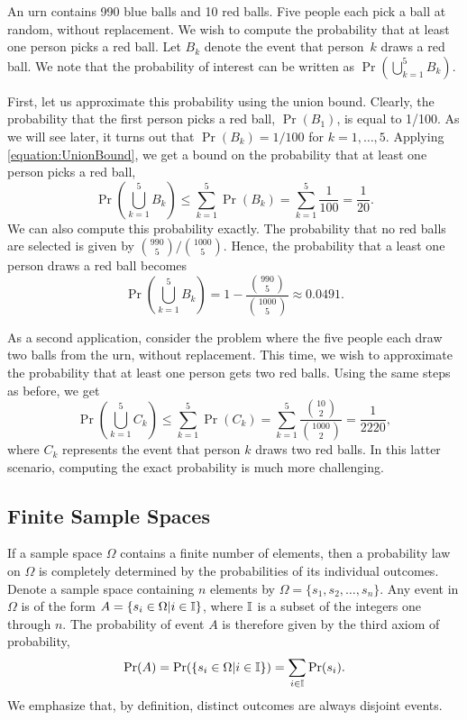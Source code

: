 \begin{example}
An urn contains 990 blue balls and 10 red balls.
Five people each pick a ball at random, without replacement.
We wish to compute the probability that at least one person picks a red ball.
Let $B_k$ denote the event that person~$k$ draws a red ball.
We note that the probability of interest can be written as $\Pr \left( \bigcup_{k=1}^5 B_k \right)$.

First, let us approximate this probability using the union bound.
Clearly, the probability that the first person picks a red ball, $\Pr (B_1)$, is equal to 1/100.
As we will see later, it turns out that $\Pr (B_k) = 1/100$ for $k=1,\ldots,5$.
Applying \eqref{equation:UnionBound}, we get a bound on the probability that at least one person picks a red ball,
\begin{equation*}
\Pr \left( \bigcup_{k=1}^5 B_k \right)
\leq \sum_{k=1}^5 \Pr ( B_k )
= \sum_{k=1}^5 \frac{1}{100} = \frac{1}{20} .
\end{equation*}
We can also compute this probability exactly.
The probability that no red balls are selected is given by $\binom{990}{5} / \binom{1000}{5}$.
Hence, the probability that a least one person draws a red ball becomes
\begin{equation*}
\Pr \left( \bigcup_{k=1}^5 B_k \right)
= 1 - \frac{\binom{990}{5}}{\binom{1000}{5}}
\approx 0.0491 .
\end{equation*}

As a second application, consider the problem where the five people each draw two balls from the urn, without replacement.
This time, we wish to approximate the probability that at least one person gets two red balls.
Using the same steps as before, we get
\begin{equation*}
\Pr \left( \bigcup_{k=1}^5 C_k \right)
\leq \sum_{k=1}^5 \Pr ( C_k )
= \sum_{k=1}^5 \frac{\binom{10}{2}}{\binom{1000}{2}} = \frac{1}{2220} ,
\end{equation*}
where $C_k$ represents the event that person $k$ draws two red balls.
In this latter scenario, computing the exact probability is much more challenging.
\end{example}


\subsection{Finite Sample Spaces}
\label{section:FiniteSampleSpaces}

If a sample space $\Omega$ contains a finite number of elements, then a probability law on $\Omega$ is completely determined by the probabilities of its individual outcomes.
Denote a sample space containing $n$ elements by $\Omega = \{ s_1, s_2, \ldots, s_n \}$.
Any event in $\Omega$ is of the form $A = \{ s_i \in \Omega | i \in \mathbb{I} \}$, where $\mathbb{I}$ is a subset of the integers one through $n$.
The probability of event $A$ is therefore given by the third axiom of probability,
\begin{equation*}
\Pr (A)
= \Pr ( \{ s_i \in \Omega | i \in \mathbb{I} \} )
= \sum_{i \in \mathbb{I}} \Pr (s_i) .
\end{equation*}
We emphasize that, by definition, distinct outcomes are always disjoint events.

